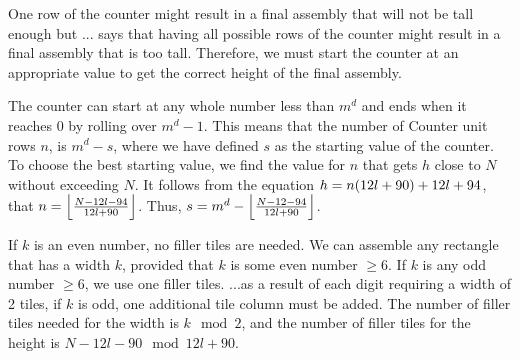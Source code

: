 %
One row of the counter might result in a final assembly that will not be tall enough but ... says that having all possible rows of the counter might result in a final assembly that is too tall.
%
Therefore, we must start the counter at an appropriate value to get the correct height of the final assembly.
%


%
The counter can start at any whole number less than $m^d$ and ends when it reaches 0 by rolling over $m^d - 1$.
%
This means that the number of Counter unit rows $n$, is $m^d - s$, where we have defined $s$ as the starting value of the counter.
%
To choose the best starting value, we find the value for $n$ that gets $h$ close to $N$ without exceeding $N$.
%
It follows from the equation $h = n(\rowheight) + \seedheight$, that $n = \floor*{\frac{N - 12l - 94}{\rowheight}}$.
%
Thus, $s = m^d - \floor*{\frac{N - 12 - 94}{\rowheight}}$.
%

%
If $k$ is an even number, no filler tiles are needed.
%
We can assemble any rectangle that has a width $k$, provided that $k$ is some even number $\geq 6$.
%
If $k$ is any odd number $\geq 6$, we use one filler tiles.
%
...as a result of each digit requiring a width of 2 tiles, if $k$ is odd, one additional tile column must be added.
%
The number of filler tiles needed for the width is $k \mod 2$, and the number of filler tiles for the height is $N - 12l - 90 \mod 12l + 90$.
%

